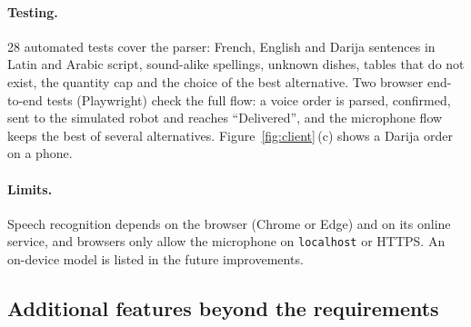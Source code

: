 \documentclass[11pt,a4paper]{article}
\begin{document}
\paragraph{Testing.} 28 automated tests cover the parser: French, English
and Darija sentences in Latin and Arabic script, sound-alike spellings,
unknown dishes, tables that do not exist, the quantity cap and the choice
of the best alternative. Two browser end-to-end tests (Playwright) check
the full flow: a voice order is parsed, confirmed, sent to the simulated
robot and reaches ``Delivered'', and the microphone flow keeps the best of
several alternatives. Figure~\ref{fig:client}\,(c) shows a Darija order on
a phone.

\paragraph{Limits.} Speech recognition depends on the browser (Chrome or
Edge) and on its online service, and browsers only allow the microphone on
\texttt{localhost} or HTTPS. An on-device model is listed in the future
improvements.

\subsection{Additional features beyond the requirements}
\label{sec:extras}
\end{document}
